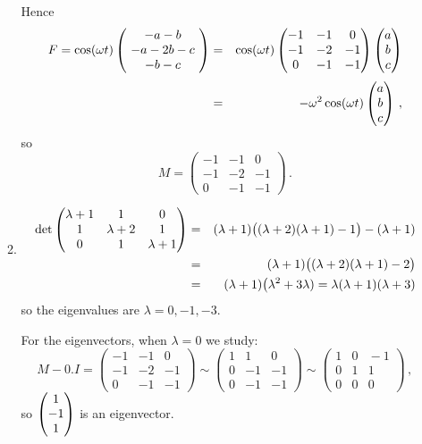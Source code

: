 \begin{enumerate}
\begin{enumerate}
Hence
\begin{eqnarray*}
F=\cos(\omega t) \left(\!\begin{array}{c} -a-b\\-a-2b-c\\-b-c \end{array}\!\right)&=&\cos(\omega t) \begin{pmatrix}-1&-1&0\\-1&-2&-1\\0&-1&-1\end{pmatrix}\begin{pmatrix} a\\b\\c \end{pmatrix}
\\[1mm]&=&-\omega^2\cos(\omega t) \begin{pmatrix} a\\b\\c \end{pmatrix}
\, ,\end{eqnarray*}
so 
$$
M=\begin{pmatrix}-1&-1&0\\-1&-2&-1\\0&-1&-1\end{pmatrix}\, .
$$
\item
\begin{eqnarray*}
\det \begin{pmatrix}\lambda+1&\mc1&\mc0\\\mc1&\lambda+2&\mc1\\\mc0&\mc1&\lambda+1\end{pmatrix}
&=&(\lambda+1)\big((\lambda+2)(\lambda+1)-1\big)-(\lambda+1)\\
&=&(\lambda+1)\big((\lambda+2)(\lambda+1)-2\big)\\
&=&(\lambda+1)\big(\lambda^2+3\lambda)=\lambda(\lambda+1)(\lambda+3)\end{eqnarray*}
so the eigenvalues are $\lambda=0,-1 ,-3 $.

For the eigenvectors, when $\lambda=0$ we study:
$$
M-0.I=\begin{pmatrix}-1&-1&0\\-1&-2&-1\\0&-1&-1\end{pmatrix}\sim\begin{pmatrix}1&1&0\\0&-1&-1\\0&-1&-1\end{pmatrix}
\sim\begin{pmatrix}1&0&\!-1\\0&1&1\\0&0&0\end{pmatrix}\, ,
$$
so $\begin{pmatrix} 1\\-1\\1 \end{pmatrix}$ is an eigenvector.


\end{enumerate}
\end{enumerate}
